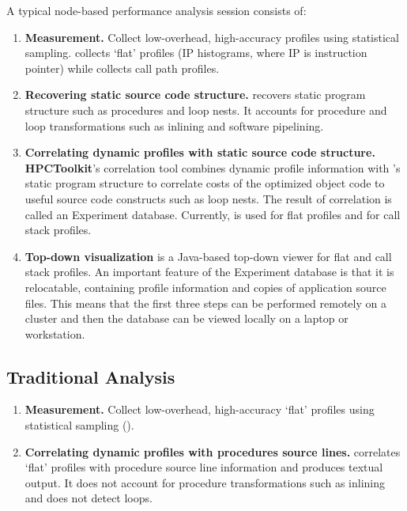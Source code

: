 \documentclass[english]{article}
\begin{document}
A typical node-based performance analysis session consists of:
\begin{enumerate}
\item \textbf{Measurement.}  
Collect low-overhead, high-accuracy profiles using statistical sampling.
 collects `flat' profiles (IP histograms, where IP is instruction pointer) while  collects call path profiles.

\item \textbf{Recovering static source code structure.} 
 recovers static program structure such as procedures and loop nests.
It accounts for procedure and loop transformations such as inlining and software pipelining.

\item \textbf{Correlating dynamic profiles with static source code structure.} 
\textbf{HPCToolkit}'s correlation tool combines dynamic profile information with 's static program structure to correlate costs of the optimized object code to useful source code constructs such as loop nests.
The result of correlation is called an Experiment database.
Currently,  is used for flat profiles and  for call stack profiles.

\item \textbf{Top-down visualization}
 is a Java-based top-down viewer for flat and call stack profiles.
An important feature of the Experiment database is that it is relocatable, containing profile information and copies of application source files.
This means that the first three steps can be performed remotely on a cluster and then the database can be viewed locally on a laptop or workstation.
\end{enumerate}

\subsection{Traditional Analysis}

\begin{enumerate}
\item \textbf{Measurement.}  
Collect low-overhead, high-accuracy `flat' profiles using statistical sampling ().

\item \textbf{Correlating dynamic profiles with procedures source lines.} 
 correlates `flat' profiles with procedure source line information and produces textual output.
It does not account for procedure transformations such as inlining and does not detect loops.
\end{enumerate}
\end{document}
